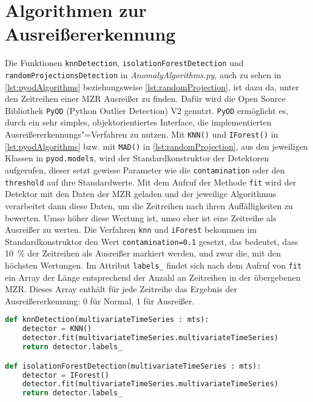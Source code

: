 \section{Algorithmen zur Ausreißererkennung}
Die Funktionen \lstinline|knnDetection|, \lstinline|isolationForestDetection| und \texttt{randomProjectionsDetec\allowbreak tion} in \textit{AnomalyAlgorithms.py}, auch zu sehen in \autoref{lst:pyodAlgorithms} beziehungsweise \autoref{lst:randomProjection}, ist dazu da, unter den Zeitreihen einer \ac{MZR} Ausreißer zu finden. Dafür wird die Open Source Bibliothek \lstinline|PyOD| (Python Outlier Detection) V2 \cite{zhao2024} genutzt. \lstinline|PyOD| ermöglicht es, durch ein sehr simples, objektorientiertes Interface, die implementierten Ausreißererkennungs"=Verfahren zu nutzen. Mit \lstinline|KNN()| und \lstinline|IForest()| in \autoref{lst:pyodAlgorithms} bzw. mit \lstinline|MAD()| in \autoref{lst:randomProjection}, aus den jeweiligen Klassen in \lstinline|pyod.models|, wird der Standardkonstruktor der Detektoren aufgerufen, dieser setzt gewisse Parameter wie die \lstinline|contamination| oder den \lstinline|threshold| auf ihre Standardwerte. Mit dem Aufruf der Methode \lstinline|fit| wird der Detektor mit den Daten der \ac{MZR} geladen und der jeweilige Algorithmus verarbeitet dann diese Daten, um die Zeitreihen nach ihren Auffälligkeiten zu bewerten. Umso höher diese Wertung ist, umso eher ist eine Zeitreihe als Ausreißer zu werten. Die Verfahren \lstinline|knn| und \lstinline|iForest| bekommen im Standardkonstruktor den Wert \lstinline|contamination=0.1| gesetzt, das bedeutet, dass 10~\% der Zeitreihen als Ausreißer markiert werden, und zwar die, mit den höchsten Wertungen. Im Attribut \lstinline|labels_| findet sich nach dem Aufruf von \lstinline|fit| ein Array der Länge entsprechend der Anzahl an Zeitreihen in der übergebenen \ac{MZR}. Dieses Array enthält für jede Zeitreihe das Ergebnis der Ausreißererkennung: 0 für Normal, 1 für Ausreißer.
\begin{lstlisting}[caption=Stückweise polynomielle Approximation, label=lst:pyodAlgorithms, style=Python, language=Python]
def knnDetection(multivariateTimeSeries : mts):
    detector = KNN()
    detector.fit(multivariateTimeSeries.multivariateTimeSeries)
    return detector.labels_

def isolationForestDetection(multivariateTimeSeries : mts):
    detector = IForest()
    detector.fit(multivariateTimeSeries.multivariateTimeSeries)
    return detector.labels_
\end{lstlisting}

